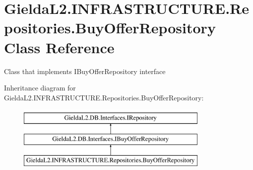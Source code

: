 \hypertarget{class_gielda_l2_1_1_i_n_f_r_a_s_t_r_u_c_t_u_r_e_1_1_repositories_1_1_buy_offer_repository}{}\section{Gielda\+L2.\+I\+N\+F\+R\+A\+S\+T\+R\+U\+C\+T\+U\+R\+E.\+Repositories.\+Buy\+Offer\+Repository Class Reference}
\label{class_gielda_l2_1_1_i_n_f_r_a_s_t_r_u_c_t_u_r_e_1_1_repositories_1_1_buy_offer_repository}


Class that implements I\+Buy\+Offer\+Repository interface  


Inheritance diagram for Gielda\+L2.\+I\+N\+F\+R\+A\+S\+T\+R\+U\+C\+T\+U\+R\+E.\+Repositories.\+Buy\+Offer\+Repository\+:\begin{figure}[H]
\begin{center}
\leavevmode
\includegraphics[height=3.000000cm]{class_gielda_l2_1_1_i_n_f_r_a_s_t_r_u_c_t_u_r_e_1_1_repositories_1_1_buy_offer_repository}
\end{center}
\end{figure}
